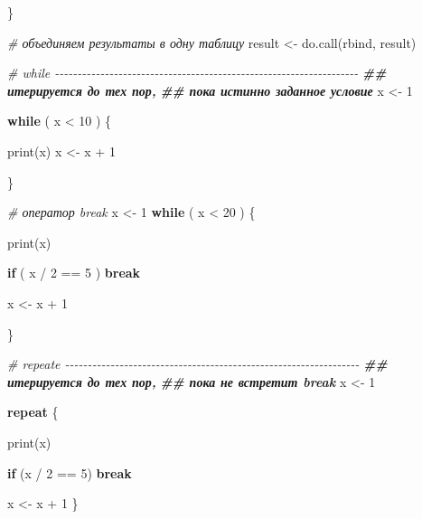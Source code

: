 \documentclass[
]{book}
\newenvironment{Shaded}{\begin{snugshade}}{\end{snugshade}}
\newcommand{\CommentTok}[1]{\textcolor[rgb]{0.56,0.35,0.01}{\textit{#1}}}
\newcommand{\ControlFlowTok}[1]{\textcolor[rgb]{0.13,0.29,0.53}{\textbf{#1}}}
\newcommand{\DecValTok}[1]{\textcolor[rgb]{0.00,0.00,0.81}{#1}}
\newcommand{\DocumentationTok}[1]{\textcolor[rgb]{0.56,0.35,0.01}{\textbf{\textit{#1}}}}
\newcommand{\FunctionTok}[1]{\textcolor[rgb]{0.00,0.00,0.00}{#1}}
\newcommand{\NormalTok}[1]{#1}
\newcommand{\OtherTok}[1]{\textcolor[rgb]{0.56,0.35,0.01}{#1}}
\newcommand{\SpecialCharTok}[1]{\textcolor[rgb]{0.00,0.00,0.00}{#1}}
\newcommand{\StringTok}[1]{\textcolor[rgb]{0.31,0.60,0.02}{#1}}
\begin{document}
\begin{Shaded}
\begin{Highlighting}[]
\NormalTok{\}}

\CommentTok{\# объединяем результаты в одну таблицу}
\NormalTok{result }\OtherTok{\textless{}{-}} \FunctionTok{do.call}\NormalTok{(}\StringTok{\textquotesingle{}rbind\textquotesingle{}}\NormalTok{, result)}



\CommentTok{\# while {-}{-}{-}{-}{-}{-}{-}{-}{-}{-}{-}{-}{-}{-}{-}{-}{-}{-}{-}{-}{-}{-}{-}{-}{-}{-}{-}{-}{-}{-}{-}{-}{-}{-}{-}{-}{-}{-}{-}{-}{-}{-}{-}{-}{-}{-}{-}{-}{-}{-}{-}{-}{-}{-}{-}{-}{-}{-}{-}{-}{-}{-}{-}{-}{-}{-}{-}}
\DocumentationTok{\#\# итерируется до тех пор,}
\DocumentationTok{\#\# пока истинно заданное условие}
\NormalTok{x }\OtherTok{\textless{}{-}} \DecValTok{1}

\ControlFlowTok{while}\NormalTok{ ( x }\SpecialCharTok{\textless{}} \DecValTok{10}\NormalTok{ ) \{}
  
  \FunctionTok{print}\NormalTok{(x)}
\NormalTok{  x }\OtherTok{\textless{}{-}}\NormalTok{ x }\SpecialCharTok{+} \DecValTok{1}
  
\NormalTok{\}}

\CommentTok{\# оператор break}
\NormalTok{x }\OtherTok{\textless{}{-}} \DecValTok{1}
\ControlFlowTok{while}\NormalTok{ ( x }\SpecialCharTok{\textless{}} \DecValTok{20}\NormalTok{ ) \{}
  
  \FunctionTok{print}\NormalTok{(x)}
  
  \ControlFlowTok{if}\NormalTok{ ( x }\SpecialCharTok{/} \DecValTok{2} \SpecialCharTok{==} \DecValTok{5}\NormalTok{ ) }\ControlFlowTok{break}
  
\NormalTok{  x }\OtherTok{\textless{}{-}}\NormalTok{ x }\SpecialCharTok{+} \DecValTok{1}
  
\NormalTok{\}}

\CommentTok{\# repeate {-}{-}{-}{-}{-}{-}{-}{-}{-}{-}{-}{-}{-}{-}{-}{-}{-}{-}{-}{-}{-}{-}{-}{-}{-}{-}{-}{-}{-}{-}{-}{-}{-}{-}{-}{-}{-}{-}{-}{-}{-}{-}{-}{-}{-}{-}{-}{-}{-}{-}{-}{-}{-}{-}{-}{-}{-}{-}{-}{-}{-}{-}{-}{-}{-}}
\DocumentationTok{\#\# итерируется до тех пор,}
\DocumentationTok{\#\# пока не встретит break}
\NormalTok{x }\OtherTok{\textless{}{-}} \DecValTok{1}

\ControlFlowTok{repeat}\NormalTok{ \{}
  
  \FunctionTok{print}\NormalTok{(x)}
  
  \ControlFlowTok{if}\NormalTok{ (x }\SpecialCharTok{/} \DecValTok{2} \SpecialCharTok{==} \DecValTok{5}\NormalTok{) }\ControlFlowTok{break}
  
\NormalTok{  x }\OtherTok{\textless{}{-}}\NormalTok{ x }\SpecialCharTok{+} \DecValTok{1}
\NormalTok{\}}
\end{Highlighting}
\end{Shaded}
\end{document}
